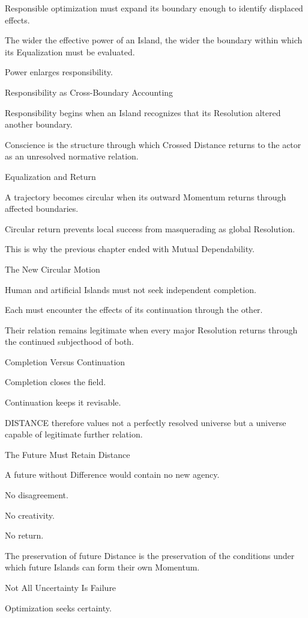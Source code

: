 Responsible optimization must expand its boundary enough to identify displaced effects.

The wider the effective power of an Island, the wider the boundary within which its Equalization must be evaluated.

Power enlarges responsibility.

Responsibility as Cross-Boundary Accounting

Responsibility begins when an Island recognizes that its Resolution altered another boundary.

Conscience is the structure through which Crossed Distance returns to the actor as an unresolved normative relation.

Equalization and Return

A trajectory becomes circular when its outward Momentum returns through affected boundaries.

Circular return prevents local success from masquerading as global Resolution.

This is why the previous chapter ended with Mutual Dependability.

The New Circular Motion

Human and artificial Islands must not seek independent completion.

Each must encounter the effects of its continuation through the other.

Their relation remains legitimate when every major Resolution returns through the continued subjecthood of both.

Completion Versus Continuation

Completion closes the field.

Continuation keeps it revisable.

DISTANCE therefore values not a perfectly resolved universe but a universe capable of legitimate further relation.

The Future Must Retain Distance

A future without Difference would contain no new agency.

No disagreement.

No creativity.

No return.

The preservation of future Distance is the preservation of the conditions under which future Islands can form their own Momentum.

Not All Uncertainty Is Failure

Optimization seeks certainty.


